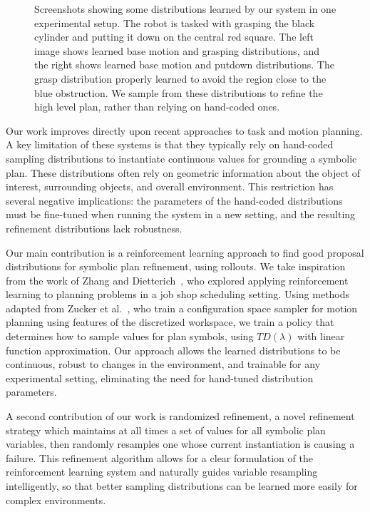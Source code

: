 \begin{figure}[h]
  \caption{Screenshots showing some distributions learned by our system in one experimental
    setup. The robot is tasked with grasping the black cylinder and putting it down on the
    central red square. The left image shows learned base motion and grasping distributions,
    and the right shows learned base motion and putdown distributions. The grasp distribution
    properly learned to avoid the region close to the blue obstruction. We sample from these distributions
    to refine the high level plan, rather than relying on hand-coded ones.}
  \label{fig:cover}
\end{figure}

Our work improves directly upon recent approaches to task and motion planning.
A key limitation of these systems is that they typically rely on hand-coded
sampling distributions to instantiate continuous values for grounding a symbolic plan.
These distributions often rely on
geometric information about the object of interest, surrounding objects, and overall
environment. This restriction has several negative implications: the parameters of the
hand-coded distributions must be fine-tuned when running the system in a new setting, and the
resulting refinement distributions lack robustness.

Our main contribution is a reinforcement learning approach to find good proposal
distributions for symbolic plan refinement, using rollouts. We take inspiration
from the work of Zhang and Dietterich~\cite{JobShopSched}, who explored applying reinforcement learning
to planning problems in a job shop scheduling setting. Using methods adapted from
Zucker et al.~\cite{workspacebias}, who train a configuration space sampler for motion planning
using features of the discretized workspace, we train a policy that
determines how to sample values for plan symbols, using $TD(\lambda)$ with linear function
approximation. Our approach allows
the learned distributions to be continuous, robust to changes in the environment, and
trainable for any experimental setting, eliminating the need for hand-tuned distribution parameters.

A second contribution of our work is randomized refinement, a novel refinement strategy
which maintains at all times a set of values for all symbolic plan variables, then randomly
resamples one whose current instantiation is causing a failure.
This refinement algorithm allows for a clear formulation of the reinforcement
learning system and naturally guides variable resampling intelligently, so that better
sampling distributions can be learned more easily for complex environments.

